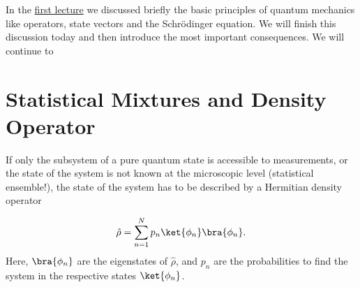 In the \href{https://www.authorea.com/326007/wyOpqBcLPiiNhswBbwDHbA}{first lecture} we discussed briefly the basic principles of quantum mechanics like operators, state vectors and the Schrödinger equation. We will finish this discussion today and then introduce the most important consequences. We will continue to 

\section{Statistical Mixtures and Density Operator}

If only the subsystem of a pure quantum state is accessible to measurements, or the state of the system is not known at the microscopic level (statistical ensemble!), the state of the system has to be described by a Hermitian density operator

\begin{align}
 \hat{\rho} = \sum_{n=1}^N p_n \ket{\phi_n}\bra{\phi_n}.
\end{align}
Here, $\bra{\phi_n}$ are the eigenstates of $\hat{\rho}$, and $p_n$ are the probabilities to find the system in the respective states $\ket{\phi_n}$.

